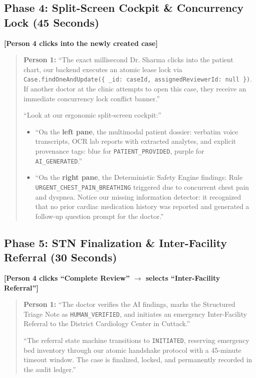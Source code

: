 \documentclass[11pt,a4paper]{article}
\begin{document}
\subsection*{Phase 4: Split-Screen Cockpit \& Concurrency Lock (45 Seconds)}
\noindent \textbf{[Person 4 clicks into the newly created case]}
\begin{quote}
\textbf{Person 1:} ``The exact millisecond Dr. Sharma clicks into the patient chart, our backend executes an atomic lease lock via \texttt{Case.findOneAndUpdate(\{ \_id: caseId, assignedReviewerId: null \})}. If another doctor at the clinic attempts to open this case, they receive an immediate concurrency lock conflict banner.''

``Look at our ergonomic split-screen cockpit:''
\begin{itemize}[leftmargin=15pt]
  \item ``On the \textbf{left pane}, the multimodal patient dossier: verbatim voice transcripts, OCR lab reports with extracted analytes, and explicit provenance tags: blue for \texttt{PATIENT\_PROVIDED}, purple for \texttt{AI\_GENERATED}.''
  \item ``On the \textbf{right pane}, the Deterministic Safety Engine findings: Rule \texttt{URGENT\_CHEST\_PAIN\_BREATHING} triggered due to concurrent chest pain and dyspnea. Notice our missing information detector: it recognized that no prior cardiac medication history was reported and generated a follow-up question prompt for the doctor.''
\end{itemize}
\end{quote}

\subsection*{Phase 5: STN Finalization \& Inter-Facility Referral (30 Seconds)}
\noindent \textbf{[Person 4 clicks ``Complete Review'' $\to$ selects ``Inter-Facility Referral'']}
\begin{quote}
\textbf{Person 1:} ``The doctor verifies the AI findings, marks the Structured Triage Note as \texttt{HUMAN\_VERIFIED}, and initiates an emergency Inter-Facility Referral to the District Cardiology Center in Cuttack.''

``The referral state machine transitions to \texttt{INITIATED}, reserving emergency bed inventory through our atomic handshake protocol with a 45-minute timeout window. The case is finalized, locked, and permanently recorded in the audit ledger.''
\end{quote}
\end{document}

